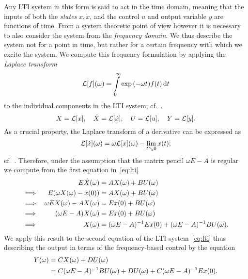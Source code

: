 Any \ac{LTI} system in this form is said to act in the time domain, meaning that the inputs of both the \emph{states} $x, \dot{x}$, and the control $u$ and output variable $y$ are functions of time.
From a system theoretic point of view however it is necessary to also consider the system from the \emph{frequency domain}.
We thus describe the system not for a point in time, but rather for a certain frequency with which we excite the system.
We compute this frequency formulation by applying the \emph{Laplace transform}
\begin{equation*}\label{eq:laplace-trafo}
    \mathcal{L}[f](\omega) = \int\limits_0^\infty \exp{(- \omega t)} f(t) \mathop{}\!\mathrm{d} t
\end{equation*}
to the individual components in the \ac{LTI} system; cf.~\cite{Arendt2011}.
\begin{equation}
    X = \mathcal{L}[x],\quad \dot{X} = \mathcal{L}[\dot{x}],\quad U = \mathcal{L}[u],\quad Y = \mathcal{L}[y].
\end{equation}
As a crucial property, the Laplace transform of a derivative can be expressed as
\begin{equation*}
    \mathcal{L}[\dot{x}](\omega) = \omega \mathcal{L}[x](\omega) - \lim\limits_{t \searrow 0} x(t);
\end{equation*}
cf.~\cite[Theorem~9.1]{Doetsch1974}.
Therefore, under the assumption that the matrix pencil $\omega E - A$ is regular we compute from the first equation in~\eqref{eq:lti}
\begin{alignat*}{3}
     & & E \dot{X}(\omega) &= A X(\omega) + B U(\omega) \\
    \implies & & E (\omega X(\omega) - x(0)) &= A X(\omega) + B U(\omega) \\
    \implies & & \omega E X(\omega) - A X(\omega) &= E x(0) + B U(\omega) \\
    \implies & & (\omega E - A) X(\omega) &= E x(0) + B U(\omega) \\
    \implies & & X(\omega) &= (\omega E - A)^{-1} E x(0) + (\omega E - A)^{-1} B U(\omega).
\end{alignat*}
We apply this result to the second equation of the \ac{LTI} system~\eqref{eq:lti} thus describing the output in terms of the frequency-based control by the equation
\begin{equation}\label{eq:frequency-output}
    \begin{aligned}
        Y(\omega) &= C X(\omega) + D U(\omega) \\
        &= C (\omega E - A)^{-1} B U(\omega) + D U(\omega) + C (\omega E - A)^{-1} E x(0).
    \end{aligned}
\end{equation}
